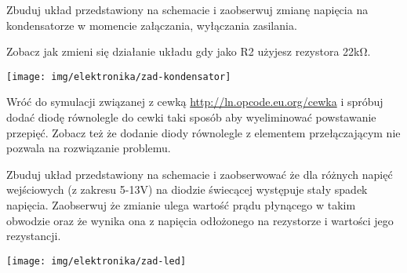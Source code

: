 % 
% 
% 
% 


\dbEntryCheckResults
\noindent\begin{minipage}[b]{0.55\textwidth}
Zbuduj układ przedstawiony na schemacie i zaobserwuj zmianę napięcia na kondensatorze w momencie załączania, wyłączania zasilania.

\vspace{13pt}

Zobacz jak zmieni się działanie układu gdy jako R2 użyjesz rezystora 22kΩ.
\end{minipage}
\hfill
\begin{minipage}[b]{0.4\textwidth}
\texttt{[image: img/elektronika/zad-kondensator]}
\end{minipage}
\fi

\dbEntryCheckResults
Wróć do symulacji związanej z cewką \url{http://ln.opcode.eu.org/cewka} i spróbuj dodać diodę równolegle do cewki taki sposób aby wyeliminować powstawanie przepięć.
Zobacz też że dodanie diody równolegle z elementem przełączającym nie pozwala na rozwiązanie problemu.
\fi

\dbEntryCheckResults
\noindent\begin{minipage}[b]{0.7\textwidth}
Zbuduj układ przedstawiony na schemacie i zaobserwować że dla różnych napięć wejściowych (z zakresu 5-13V) na diodzie świecącej występuje stały spadek napięcia.
Zaobserwuj że zmianie ulega wartość prądu płynącego w takim obwodzie oraz że wynika ona z napięcia odłożonego na rezystorze i wartości jego rezystancji.
\end{minipage}
\hfill
\begin{minipage}[b]{0.25\textwidth}
\texttt{[image: img/elektronika/zad-led]}\vspace{0.5cm}
\end{minipage}
\fi

